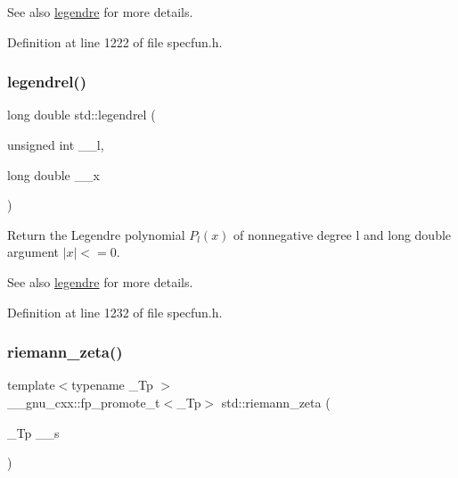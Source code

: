 \begin{DoxySeeAlso}{See also}
\hyperlink{group__mathsf__std_gad06811f4e139b0ba84235c1f0d34d86e}{legendre} for more details. 
\end{DoxySeeAlso}


Definition at line 1222 of file specfun.\+h.

\mbox{\label{group__mathsf__std_ga1b39bc22e3cc4860d08eb54099460391}} 
\subsubsection{\texorpdfstring{legendrel()}{legendrel()}}
{\footnotesize\ttfamily long double std\+::legendrel (\begin{DoxyParamCaption}\item[{unsigned int}]{\+\_\+\+\_\+l,  }\item[{long double}]{\+\_\+\+\_\+x }\end{DoxyParamCaption})\hspace{0.3cm}{\ttfamily [inline]}}

Return the Legendre polynomial $ P_l(x) $ of nonnegative degree {\ttfamily l} and {\ttfamily long double} argument $ |x| <= 0 $.

\begin{DoxySeeAlso}{See also}
\hyperlink{group__mathsf__std_gad06811f4e139b0ba84235c1f0d34d86e}{legendre} for more details. 
\end{DoxySeeAlso}


Definition at line 1232 of file specfun.\+h.

\mbox{\label{group__mathsf__std_gac4ef9d52ee583c77937c3a420b7c72ca}} 
\subsubsection{\texorpdfstring{riemann\+\_\+zeta()}{riemann\_zeta()}}
{\footnotesize\ttfamily template$<$typename \+\_\+\+Tp $>$ \\
\+\_\+\+\_\+gnu\+\_\+cxx\+::fp\+\_\+promote\+\_\+t$<$\+\_\+\+Tp$>$ std\+::riemann\+\_\+zeta (\begin{DoxyParamCaption}\item[{\+\_\+\+Tp}]{\+\_\+\+\_\+s }\end{DoxyParamCaption})\hspace{0.3cm}{\ttfamily [inline]}}

